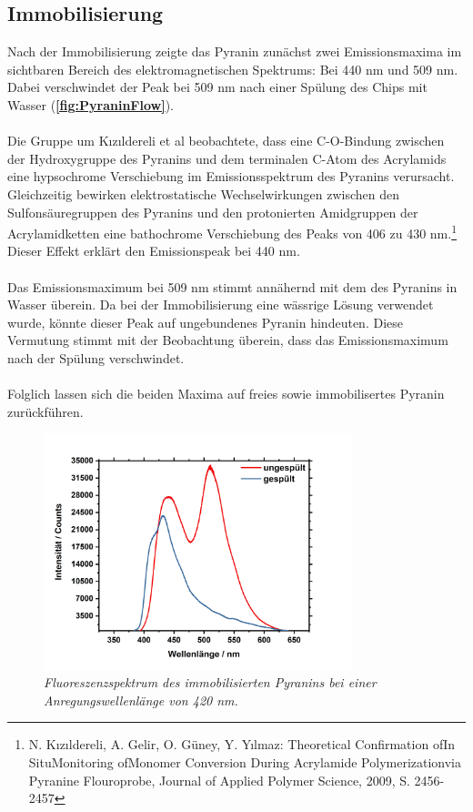 \documentclass[12pt,a4paper]{report}
\begin{document}
	\subsection{Immobilisierung}
		Nach der Immobilisierung zeigte das Pyranin zunächst zwei Emissionsmaxima im sichtbaren Bereich des elektromagnetischen Spektrums: Bei 440 nm und 509 nm. Dabei verschwindet der Peak bei 509 nm nach einer Spülung des Chips mit Wasser  (\textbf{\autoref{fig:PyraninFlow}}).\\
		\ \\
		\noindent Die Gruppe um \textnormal{Kızıldereli et al} beobachtete, dass eine  C-O-Bindung zwischen der Hydroxygruppe des Pyranins und dem terminalen C-Atom des Acrylamids eine hypsochrome Verschiebung im Emissionsspektrum des Pyranins verursacht. Gleichzeitig bewirken elektrostatische Wechselwirkungen zwischen den Sulfonsäuregruppen des Pyranins und den protonierten Amidgruppen der Acrylamidketten eine bathochrome Verschiebung des Peaks von 406 zu 430 nm.\footnote{N. Kızıldereli, A. Gelir, O. Güney, Y. Yılmaz: Theoretical Confirmation ofIn SituMonitoring ofMonomer Conversion During Acrylamide Polymerizationvia Pyranine Flouroprobe, Journal of Applied Polymer Science, 2009, S. 2456-2457} Dieser Effekt erklärt den Emissionspeak bei 440 nm.\\
		\ \\
		Das Emissionsmaximum bei 509 nm stimmt annähernd mit dem des Pyranins in Wasser überein. Da bei der Immobilisierung eine wässrige Lösung verwendet wurde, könnte dieser Peak auf ungebundenes Pyranin hindeuten. Diese Vermutung stimmt mit der Beobachtung überein, dass das Emissionsmaximum nach der Spülung verschwindet.\\
		\ \\
		Folglich lassen sich die beiden Maxima auf freies sowie immobilisertes  Pyranin zurückführen.
			\begin{figure}[h!]
			\centering 
			\includegraphics[width=0.8\textwidth]{ImmoPyranin.jpg}
			\caption{\textnormal{\textit{Fluoreszenzspektrum des immobilisierten Pyranins bei einer Anregungswellenlänge von 420 nm.}}}
			\label{fig:PyraninFlow}
			\end{figure} 
	\newpage 
\end{document}
